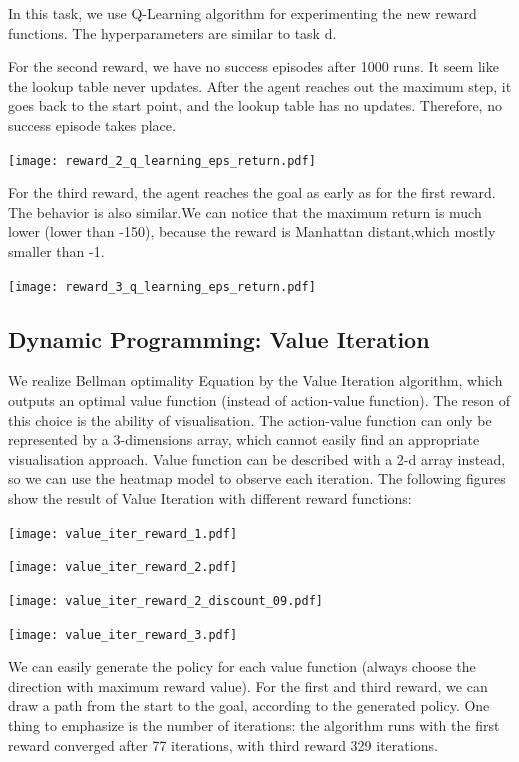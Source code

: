 \documentclass[11pt]{article}
\begin{document}
In this task, we use Q-Learning algorithm for experimenting the new reward functions. The hyperparameters are similar to task d.

For the second reward, we have no success episodes after 1000 runs. It seem like the lookup table never updates. After the agent reaches out the maximum step, it goes back to the start point, and the lookup table has no updates. Therefore, no success episode takes place.

\texttt{[image: reward\_2\_q\_learning\_eps\_return.pdf]}

For the third reward, the agent reaches the goal as early as for the first reward. The behavior is also similar.We can notice that the maximum return is much lower (lower than -150), because the reward is Manhattan distant,which mostly smaller than -1.

\texttt{[image: reward\_3\_q\_learning\_eps\_return.pdf]}

\subsection{Dynamic Programming: Value Iteration}

We realize Bellman optimality Equation by the Value Iteration algorithm, which outputs an optimal value function (instead of action-value function). The reson of this choice is the ability of visualisation. The action-value function can only be represented by a 3-dimensions array, which cannot easily find an appropriate visualisation approach. Value function can be described with a 2-d array instead, so we can use the heatmap model to observe each iteration. The following figures show the result of Value Iteration with different reward functions:

\texttt{[image: value\_iter\_reward\_1.pdf]}

\texttt{[image: value\_iter\_reward\_2.pdf]}

\texttt{[image: value\_iter\_reward\_2\_discount\_09.pdf]}

\texttt{[image: value\_iter\_reward\_3.pdf]}

We can easily generate the policy for each value function (always choose the direction with maximum reward value). For the first and third reward, we can draw a path from the start to the goal, according to the generated policy. One thing to emphasize is the number of iterations: the algorithm runs with the first reward converged after 77 iterations, with third reward 329 iterations.
\end{document}
